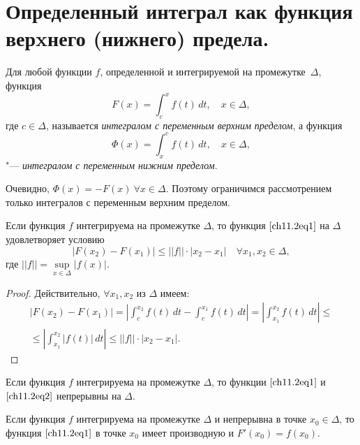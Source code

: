 \section{Определенный интеграл как функция верxнего (нижнего) предела.}

Для любой функции $f$, определенной и интегрируемой на промежутке~$\Delta$, функция
\begin{equation} \label{ch11.2eq1}
F(x) = \int_{c}^{x} f(t) \,dt, \quad x \in \Delta,
\end{equation}
где $c \in \Delta$, называется \textit{интегралом с переменным верхним пределом}, а функция
\begin{equation} \label{ch11.2eq2}
\Phi(x) = \int_{x}^{c} f(t) \,dt, \quad x \in \Delta,
\end{equation}
"--- \textit{интегралом с переменным нижним пределом}.

Очевидно, $\Phi(x) = -F(x)\ \forall x \in \Delta$. Поэтому ограничимся рассмотрением только интегралов с переменным верхним пределом.

\begin{thm}
Если функция $f$ интегрируема на промежутке $\Delta$, то функция $\eqref{ch11.2eq1}$ на $\Delta$ удовлетворяет условию
$$
|F(x_2) - F(x_1)| \le ||f|| \cdot |x_2 - x_1| \quad \forall x_1, x_2 \in \Delta,
$$
где $||f|| = \sup\limits_{x \in \Delta} |f(x)|$.
\end{thm}

\begin{proof}
Действительно, $\forall x_1, x_2$ из $\Delta$ имеем:
\begin{multline*}
|F(x_2) - F(x_1)| = \left| \int_{c}^{x_2}f(t) \,dt - \int_{c}^{x_1} f(t) \,dt\right| = \left| \int_{x_1}^{x_2}f(t) \,dt \right| \le\\ \le \left| \int_{x_1}^{x_2}|f(t)| \,dt \right| \le ||f|| \cdot |x_2 - x_1|.\tag*{\qedhere}
\end{multline*}
\end{proof}

\begin{cons}
Если функция $f$ интегрируема на промежутке $\Delta$, то функции $\eqref{ch11.2eq1}$ и $\eqref{ch11.2eq2}$ непрерывны на $\Delta$.
\end{cons}

\begin{thm}
Если функция $f$ интегрируема на промежутке $\Delta$ и непрерывна в точке $x_0 \in \Delta$, то функция $\eqref{ch11.2eq1}$ в точке $x_0$ имеет производную и $F'(x_0) = f(x_0)$.
\end{thm}

